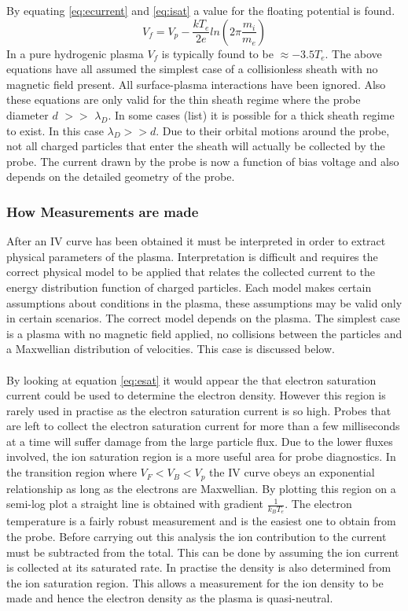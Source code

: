 \documentclass[12pt]{article}
\def\be{\begin{equation}}
\def\ee{\end{equation}}
\begin{document}
By equating \eqref{eq:ecurrent}  and \eqref{eq:isat} a value for the floating potential is found. 
\be 
V_f = V_{p} - \frac{k T_e}{2 e} ln\left(2 \pi\frac{m_i}{m_e}\right)
\label{eq:floating}
\ee
In a pure hydrogenic plasma $V_f$ is typically found to be $\approx -3.5 T_e $. 
The above equations have all assumed the simplest case of a collisionless sheath with no magnetic field present. All surface-plasma interactions have been ignored. Also these equations are only valid for the thin sheath regime where the probe diameter $d$ $>>$ $\lambda_D$. In some cases (list) it is possible for a thick sheath regime to exist. In this case $\lambda_D >> d$. Due to their orbital motions around the probe, not all charged particles that enter the sheath will actually be collected by the probe. The current drawn by the probe is now a function of bias voltage and also depends on the detailed geometry of the probe. 

\subsubsection{How Measurements are made} 
After an IV curve has been obtained it must be interpreted in order to extract physical parameters of the plasma. Interpretation is difficult and requires the correct physical model to be applied that relates the collected current to the energy distribution function of charged particles. Each model makes certain assumptions about conditions in the plasma, these assumptions may be valid only in certain scenarios. The correct model depends on the plasma. The simplest case is a plasma with no magnetic field applied, no collisions between the particles and a Maxwellian distribution of velocities. This case is discussed below.  
\paragraph{}
By looking at equation \eqref{eq:esat} it would appear the that electron saturation current could be used to determine the electron density. However this region is rarely used in practise as the electron saturation current is so high. Probes that are left to collect the electron saturation current for more than a few milliseconds at a time will suffer damage from the large particle flux. Due to the lower fluxes involved, the ion saturation region is a more useful area for probe diagnostics. 
In the transition region where $V_F < V_B < V_{p} $ the IV curve obeys an exponential relationship as long as the electrons are Maxwellian. By plotting this region on a semi-log plot a straight line is obtained with gradient $\frac{1}{k_B T_e}$. The electron temperature is a fairly robust measurement and is the easiest one to obtain from the probe. Before carrying out this analysis the ion contribution to the current must be subtracted from the total. This can be done by assuming the ion current is collected at its saturated rate. In practise the density is also determined from the ion saturation region. This allows a measurement for the ion density to be made and hence the electron density as the plasma is quasi-neutral.
\end{document}
